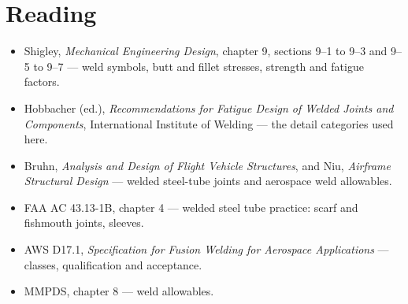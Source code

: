 \documentclass[11pt,a4paper]{article}
\begin{document}
\section*{Reading}

\begin{itemize}[leftmargin=*,nosep]
\item Shigley, \emph{Mechanical Engineering Design}, chapter 9, sections 9--1 to 9--3 and 9--5 to
  9--7 --- weld symbols, butt and fillet stresses, strength and fatigue factors.
\item Hobbacher (ed.), \emph{Recommendations for Fatigue Design of Welded Joints and Components},
  International Institute of Welding --- the detail categories used here.
\item Bruhn, \emph{Analysis and Design of Flight Vehicle Structures}, and Niu, \emph{Airframe
  Structural Design} --- welded steel-tube joints and aerospace weld allowables.
\item FAA AC 43.13-1B, chapter 4 --- welded steel tube practice: scarf and fishmouth joints, sleeves.
\item AWS D17.1, \emph{Specification for Fusion Welding for Aerospace Applications} --- classes,
  qualification and acceptance.
\item MMPDS, chapter 8 --- weld allowables.
\end{itemize}
\end{document}

